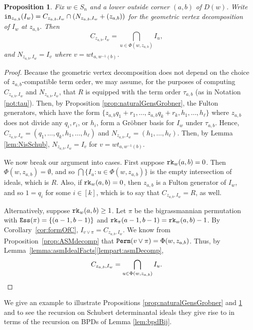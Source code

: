 \documentclass[12pt,reqno]{amsart}
\newtheorem{proposition}[theorem]{Proposition}
\newtheorem{Main Conjecture}[theorem]{Main Conjecture}
\theoremstyle{remark}
\theoremstyle{plain}
\newcommand{\init}{{\tt in}}
\newcommand{\ess}{{\tt Ess}}
\newcommand{\perm}{{\tt Perm}}
\newcommand{\rk}{{\tt rk}}
\begin{document}
\begin{proposition}
\label{prop:linkDecomp}
Fix $w \in S_n$ and a lower outside corner $(a,b)$ of $D(w)$.   
Write $\init_{z_{a,b}} (I_w) = C_{z_{a,b},I_w} \cap ( N_{z_{a,b},I_w}+(z_{a,b}))$ for the geometric vertex decomposition of $I_w$ at $z_{a,b}$. Then \[C_{z_{a,b},I_w} =  \bigcap_{u \in \Phi(w,z_{a,b})} I_{u},\] and $N_{z_{a,b},I_w} = I_v$ where $v = wt_{a, w^{-1}(b)}$.
\end{proposition}
\begin{proof}
Because the geometric vertex decomposition does not depend on the choice of $z_{a,b}$-compatible term order, we may assume, for the purposes of computing $C_{z_{a,b},I_w}$ and $N_{z_{a,b},I_w}$, that $R$ is equipped with the term order $\tau_{a,b}$ (as in Notation \ref{not:tau}).  Then, by Proposition \ref{prop:naturalGensGrobner}, the Fulton generators, which have the form $\{z_{a,b}q_1+r_1, \ldots, z_{a,b}q_k+r_k, h_1, \ldots, h_\ell\}$ where $z_{a,b}$ does not divide any $q_i, r_i$, or $h_i$, 
form a Gr\"obner basis for $I_w$ under $\tau_{a,b}$.  Hence, $C_{z_{a,b},I_w} = (q_1, \ldots, q_k, h_1, \ldots, h_\ell)$ and $N_{z_{a,b},I_w} = (h_1, \ldots, h_\ell)$.  Then, by Lemma \ref{lem:NisSchub}, $N_{z_{a,b},I_w}=I_v$ for $v = wt_{a, w^{-1}(b)}$.  


We now break our argument into cases.  First suppose $\rk_w(a,b)=0$.  Then $\Phi(w,z_{a,b})=\emptyset$, and so 
$\bigcap\{ I_{u}:u \in \Phi(w,z_{a,b})\}$
is the empty intersection of ideals, which is $R$.  Also, if $\rk_w(a,b)=0$, then $z_{a,b}$ is a Fulton generator of $I_w$, and so $1 = q_i$ for some $i \in [k]$, which is to say that $C_{z_{a,b},I_w} = R$, as well.

Alternatively, suppose $\rk_w(a,b)\geq 1$.  Let $\pi$ be the bigrassmannian permutation with $\ess(\pi)=\{(a-1,b-1)\}$ and $\rk_\pi(a-1,b-1)=\rk_w(a,b)-1$.  By Corollary~\ref{cor:formOfC}, $I_{v \vee \pi}=C_{z_{a,b},I_w}$.  We know from Proposition~\ref{prop:ASMdecomp} that $\perm(v \vee \pi)=\Phi(w,z_{a,b})$. Thus, by Lemma~\ref{lemma:asmIdealFacts}\ref{lempart:asmDecomp}, \[C_{z_{a,b},I_w} =  \bigcap_{u \in \Phi(w,z_{a,b})} I_{u}. \qedhere\]
\end{proof}

We give an example to illustrate Propositions \ref{prop:naturalGensGrobner} and \ref{prop:linkDecomp} and to see the recursion on Schubert determinantal ideals they give rise to in terms of the recursion on BPDs of Lemma \ref{lem:bpdBij}.
\end{document}
